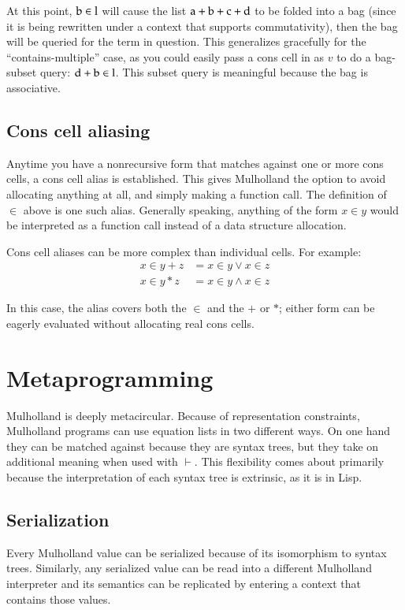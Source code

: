 \documentclass{report}
\begin{document}
    At this point, $\textrm b \in \textrm l$ will cause the list $\textrm a + \textrm b + \textrm c + \textrm d$ to be folded into a bag (since it is being rewritten under a
    context that supports commutativity), then the bag will be queried for the term in question. This generalizes gracefully for the ``contains-multiple'' case, as you could easily pass a cons
    cell in as $v$ to do a bag-subset query: $\textrm d + \textrm b \in \textrm l$. This subset query is meaningful because the bag is associative.

\section{Cons cell aliasing}
    Anytime you have a nonrecursive form that matches against one or more cons cells, a cons cell alias is established. This gives Mulholland the option to avoid allocating anything at all,
    and simply making a function call. The definition of $\in$ above is one such alias. Generally speaking, anything of the form $x \in y$ would be interpreted as a function call instead of a
    data structure allocation.

    Cons cell aliases can be more complex than individual cells. For example:
\begin{align*}
x \in y + z & = x \in y \vee x \in z \\
x \in y * z & = x \in y \wedge x \in z
\end{align*}

    In this case, the alias covers both the $\in$ and the $+$ or $*$; either form can be eagerly evaluated without allocating real cons cells.

\chapter{Metaprogramming}
  Mulholland is deeply metacircular. Because of representation constraints, Mulholland programs can use equation lists in two different ways. On one hand they can be matched against because
  they are syntax trees, but they take on additional meaning when used with $\vdash$. This flexibility comes about primarily because the interpretation of each syntax tree is extrinsic, as it
  is in Lisp.

\section{Serialization}
    Every Mulholland value can be serialized because of its isomorphism to syntax trees. Similarly, any serialized value can be read into a different Mulholland interpreter and its semantics
    can be replicated by entering a context that contains those values.
\end{document}
